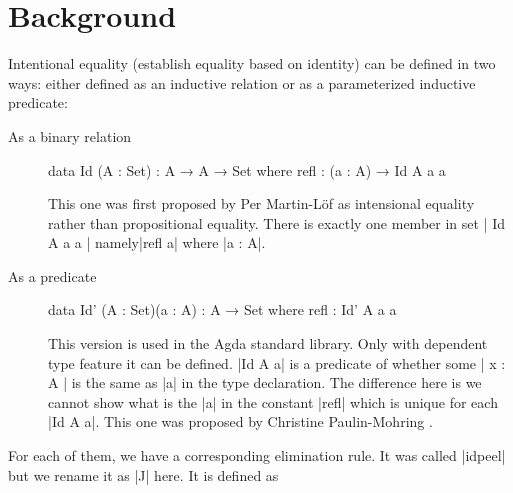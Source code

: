 

\maketitle

\section{Background}

Intentional equality (establish equality based on identity) can be defined in two ways: either defined as an inductive
relation or as a parameterized inductive predicate:

\begin{description}
\item[As a binary relation]

\begin{code}
data Id (A : Set) : A → A → Set where
  refl : (a : A) → Id A a a
\end{code}

This one was first
proposed by Per Martin-Löf as intensional equality rather than
propositional equality\cite{Nord}.
There is exactly one member in set | Id A a a | namely|refl a| where
|a : A|.

\item[As a predicate]

\begin{code}
data Id' (A : Set)(a : A) : A → Set where
  refl : Id' A a a
\end{code}
This version is used in the Agda standard library. Only with dependent
type feature it can be defined. |Id A
a| is a predicate of whether some | x : A | is the same as
|a| in the type declaration. The difference here is we cannot show
what is the |a| in the constant |refl| which is unique
for each |Id A a|.
This one was proposed by Christine Paulin-Mohring \cite{coq}.
\end{description}

For each of them, we have a corresponding elimination rule. It was
called |idpeel| \cite{Nord} but we rename it as |J| here. It is defined as

